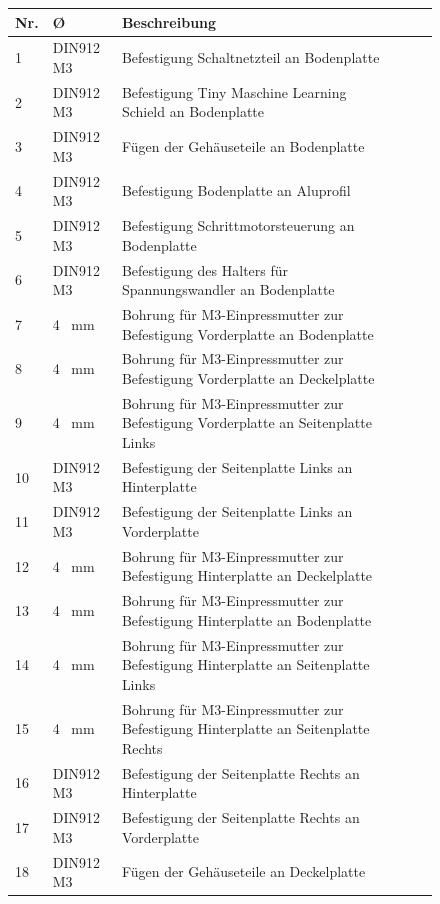 \begin{figure}[H]
\begin{center}
	\fontsize{8}{10}\selectfont
	\begin{tabularx}{\textwidth}{|p{0.4cm}|p{1.2cm}|X|X|X|X|} 
		\hline 
		\textbf{Nr.} & \textbf{\O} & \textbf{Beschreibung} \\ \hline
		1 & DIN912 M3 & Befestigung Schaltnetzteil an Bodenplatte \\ \hline
		2 & DIN912 M3 & Befestigung Tiny Maschine Learning Schield an Bodenplatte \\ \hline
		3 & DIN912 M3 & Fügen der Gehäuseteile an Bodenplatte  \\ \hline
		4 & DIN912 M3 & Befestigung Bodenplatte an Aluprofil \\ \hline
		5 & DIN912 M3 & Befestigung Schrittmotorsteuerung an Bodenplatte \\ \hline
		6 & DIN912 M3 & Befestigung des Halters für Spannungswandler an Bodenplatte \\ \hline
		7 & 4 \ mm & Bohrung für M3-Einpressmutter zur Befestigung Vorderplatte an Bodenplatte \\ \hline
		8 & 4 \ mm & Bohrung für M3-Einpressmutter zur Befestigung Vorderplatte an Deckelplatte \\ \hline
		9 & 4 \ mm & Bohrung für M3-Einpressmutter zur Befestigung Vorderplatte an Seitenplatte Links \\ \hline
		10& DIN912 M3 & Befestigung der Seitenplatte Links an Hinterplatte \\ \hline
		11& DIN912 M3 & Befestigung der Seitenplatte Links an Vorderplatte \\ \hline
		12& 4 \ mm & Bohrung für M3-Einpressmutter zur Befestigung Hinterplatte an Deckelplatte \\ \hline
		13& 4 \ mm & Bohrung für M3-Einpressmutter zur Befestigung Hinterplatte an Bodenplatte \\ \hline
		14& 4 \ mm & Bohrung für M3-Einpressmutter zur Befestigung Hinterplatte an Seitenplatte Links \\ \hline
		15& 4 \ mm & Bohrung für M3-Einpressmutter zur Befestigung Hinterplatte an Seitenplatte Rechts \\ \hline
		16& DIN912 M3 & Befestigung der Seitenplatte Rechts an Hinterplatte \\ \hline
		17& DIN912 M3 & Befestigung der Seitenplatte Rechts an Vorderplatte \\ \hline
		18& DIN912 M3 & Fügen der Gehäuseteile an Deckelplatte \\ \hline
	\end{tabularx}
		\label{BohrungenGK}
\end{center}
\end{figure}

